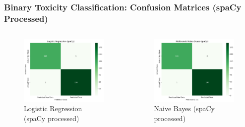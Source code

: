 \documentclass{beamer}
\begin{document}
\begin{frame}
\frametitle{Binary Toxicity Classification: Confusion Matrices (spaCy Processed)}

\begin{columns}
\begin{column}{0.5\textwidth}
\begin{figure}
\centering
\includegraphics[width=\linewidth]{figures/confusion_lr_spacy.png}
\caption{Logistic Regression (spaCy processed)}
\end{figure}
\end{column}

\begin{column}{0.5\textwidth}
\begin{figure}
\centering
\includegraphics[width=\linewidth]{figures/confusion_nb_spacy.png}
\caption{Naive Bayes (spaCy processed)}
\end{figure}
\end{column}
\end{columns}

\end{frame}
\end{document}
